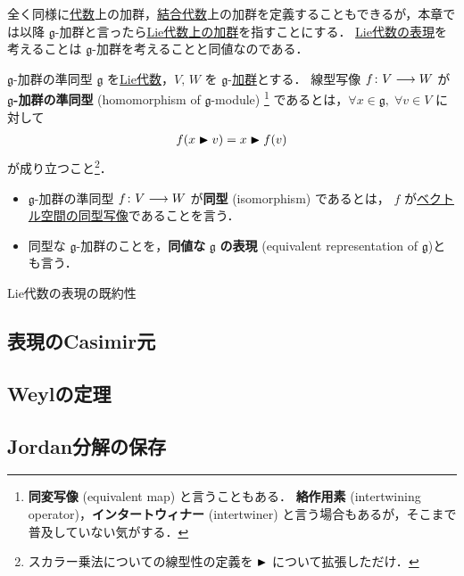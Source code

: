 \documentclass[rep_main]{subfiles}
\begin{document}
全く同様に\hyperref[def:Alg]{代数}上の加群，\hyperref[def:Alg]{結合代数}上の加群を定義することもできるが，本章では以降 $\mathfrak{g}$-加群と言ったら\hyperref[ax:g-module]{Lie代数上の加群}を指すことにする．
\hyperref[def:rep-LieAlg]{Lie代数の表現}を考えることは $\mathfrak{g}$-加群を考えることと同値なのである．

\begin{mydef}[label=def:g-module-hom]{$\mathfrak{g}$-加群の準同型}
    $\mathfrak{g}$ を\hyperref[ax:LieAlg]{Lie代数}，$V,\, W$ を $\mathfrak{g}$-\hyperref[ax:g-module]{加群}とする．
    線型写像 $f \colon V \longrightarrow W$ が $\bm{\mathfrak{g}}$\textbf{-加群の準同型} (homomorphism of $\mathfrak{g}$-module)
    \footnote{
        \textbf{同変写像} (equivalent map) と言うこともある．
        \textbf{絡作用素} (intertwining operator)，\textbf{インタートウィナー} (intertwiner) と言う場合もあるが，そこまで普及していない気がする．
    } であるとは，$\forall x \in \mathfrak{g},\; \forall v \in V$ に対して
    \begin{align}
        f(x \blacktriangleright v) = x \blacktriangleright f(v)
    \end{align}
    が成り立つこと\footnote{スカラー乗法についての線型性の定義を $\blacktriangleright$ について拡張しただけ．}．
    \tcblower
    \begin{itemize}
        \item $\mathfrak{g}$-加群の準同型 $f \colon V \longrightarrow W$ が\textbf{同型} (isomorphism) であるとは，
        $f$ が\underline{ベクトル空間の同型写像}であることを言う．
        \item 同型な $\mathfrak{g}$-加群のことを，\textbf{同値な} $\bm{\mathfrak{g}}$ \textbf{の表現} (equivalent representation of $\mathfrak{g}$)とも言う．
    \end{itemize}
\end{mydef}


\begin{mydef}[label=def:irr]{Lie代数の表現の既約性}
    
\end{mydef}


\subsection{表現のCasimir元}
\subsection{Weylの定理}
\subsection{Jordan分解の保存}
\end{document}

